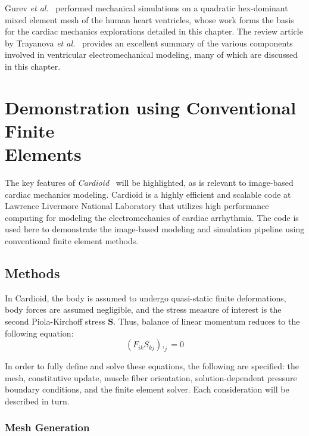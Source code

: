 Gurev \textit{et al.}~\cite{gurev_2015} performed mechanical simulations on a quadratic hex-dominant mixed element mesh of the human heart ventricles, whose work forms the basis for the cardiac mechanics explorations detailed in this chapter. The review article by Trayanova \textit{et al.}~\cite{trayanova_2011} provides an excellent summary of the various components involved in ventricular electromechanical modeling, many of which are discussed in this chapter.

\section[Demonstration using Conventional Finite Elements]{Demonstration using Conventional Finite \\ Elements}

The key features of \textit{Cardioid}~\cite{richards_2013, gurev_2015} will be highlighted, as is relevant to image-based cardiac mechanics modeling. Cardioid is a highly efficient and scalable code at Lawrence Livermore National Laboratory that utilizes high performance computing for modeling the electromechanics of cardiac arrhythmia. The code is used here to demonstrate the image-based modeling and simulation pipeline using conventional finite element methods.

\subsection{Methods}
\label{Methods}

In Cardioid, the body is assumed to undergo quasi-static finite deformations, body forces are assumed negligible, and the stress measure of interest is the second Piola-Kirchoff stress $\bm{S}$. Thus, balance of linear momentum reduces to the following equation:
\begin{equation}
(F_{ik}S_{kj}),_{j} = 0
\end{equation}

In order to fully define and solve these equations, the following are specified: the mesh, constitutive update, muscle fiber orientation, solution-dependent pressure boundary conditions, and the finite element solver. Each consideration will be described in turn.

\subsubsection{Mesh Generation}
\label{Mesh Generation}

